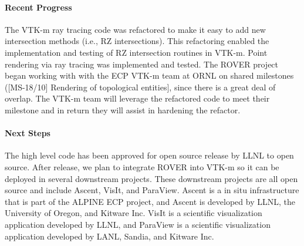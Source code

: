 \paragraph{Recent Progress}

The VTK-m ray tracing code was refactored to make it easy to add new
intersection methods (i.e., RZ intersections).  This refactoring enabled the
implementation and testing of RZ intersection routines in VTK-m.  Point
rendering via ray tracing was implemented and tested.  The ROVER project began
working with with the ECP VTK-m team at ORNL on shared milestones ([MS-18/10]
Rendering of topological entities], since there is a great deal of overlap. The
VTK-m team will leverage the refactored code to meet their milestone and in
return they will assist in hardening the refactor.  

\paragraph{Next Steps}
The high level code has been approved for open source release by LLNL to open
source.  After release, we plan to integrate ROVER into VTK-m so it can be
deployed in several downstream projects. These downstream projects are all open
source and include Ascent, VisIt, and ParaView. Ascent is a in situ
infrastructure that is part of the ALPINE ECP project, and Ascent is developed
by LLNL, the University of Oregon, and Kitware Inc. VisIt is a scientific
visualization application developed by LLNL, and ParaView is a scientific
visualization application developed by LANL, Sandia, and Kitware Inc.

